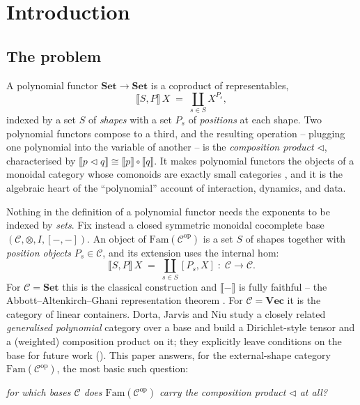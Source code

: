 \documentclass[11pt]{amsart}
\theoremstyle{plain}
\theoremstyle{definition}
\newcommand{\C}{\mathcal{C}}
\newcommand{\Fam}{\mathrm{Fam}}
\newcommand{\ext}[1]{\llbracket #1 \rrbracket}
\newcommand{\Setb}{\mathbf{Set}}
\newcommand{\Vecb}{\mathbf{Vec}}
\newcommand{\op}{\mathrm{op}}
\newcommand{\comp}{\mathbin{\triangleleft}}
\begin{document}
\maketitle

\begin{center}
\end{center}

\section{Introduction}

\subsection*{The problem}
A polynomial functor $\Setb\to\Setb$ is a coproduct of representables,
\[
   \ext{S,P}\,X \;=\; \coprod_{s\in S} X^{P_s},
\]
indexed by a set $S$ of \emph{shapes} with a set $P_s$ of \emph{positions} at each shape.
Two polynomial functors compose to a third, and the resulting operation -- plugging one polynomial
into the variable of another -- is the \emph{composition product} $\comp$, characterised by
$\ext{p\comp q}\cong\ext p\circ\ext q$. It makes polynomial functors the objects of a monoidal
category whose comonoids are exactly small categories \cite{NiuSpivak,DJN}, and it is the algebraic
heart of the ``polynomial'' account of interaction, dynamics, and data.

Nothing in the definition of a polynomial functor needs the exponents to be indexed by \emph{sets}.
Fix instead a closed symmetric monoidal cocomplete base $(\C,\otimes,I,[-,-])$. An object of
$\Fam(\C^{\op})$ is a set $S$ of shapes together with \emph{position objects} $P_s\in\C$, and its
extension uses the internal hom:
\[
   \ext{S,P}\,X \;=\; \coprod_{s\in S}[P_s,X]\;:\;\C\to\C .
\]
For $\C=\Setb$ this is the classical construction and $\ext{-}$ is fully faithful -- the
Abbott--Altenkirch--Ghani representation theorem \cite{AAG}. For $\C=\Vecb$ it is the category of
linear containers. Dorta, Jarvis and Niu \cite{DJN} study a closely related \emph{generalised
polynomial} category over a base and build a Dirichlet-style tensor and a (weighted) composition
product on it; they explicitly leave conditions on the base for future work
(\cite[\S6]{DJN}). This paper answers, for the external-shape category $\Fam(\C^{\op})$, the most
basic such question:
\begin{center}
\emph{for which bases $\C$ does $\Fam(\C^{\op})$ carry the composition product $\comp$ at all?}
\end{center}
\end{document}
